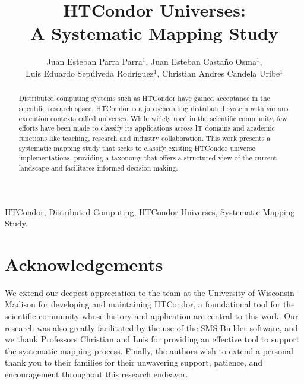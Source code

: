 \documentclass[10pt]{cys}
\title{HTCondor Universes:\\ A Systematic Mapping Study}
\author{Juan Esteban Parra Parra$^1$\orcidlink{0009-0007-4518-1086}, Juan Esteban Castaño Osma$^1$\orcidlink{0009-0006-0402-4351},\\
Luis Eduardo Sepúlveda Rodríguez$^1$\orcidlink{0000-0003-2446-0602}, Christian Andres Candela Uribe$^1$\orcidlink{0000-0002-3961-1840}}
\affil{ 
$^1$ University of Quindío, Engineering Faculty, Armenia, \authorcr   %
Colombia             
\authorcr \authorcr
juane.parrap@uqvirtual.edu.co, juane.castanoo@uqvirtual.edu.co,\\
lesepulveda@uniquindio.edu.co, cacandela@uniquindio.edu.co
\authorcr  \authorcr
}
\begin{document}
\maketitle

\renewcommand{\tablename}{Table}

\begin{abstract}
Distributed computing systems such as HTCondor have gained acceptance in the scientific research space. HTCondor is a job scheduling distributed system with various execution contexts called universes. While widely used in the scientific community, few efforts have been made to classify its applications across IT domains and academic functions like teaching, research and industry collaboration. This work presents a systematic mapping study that seeks to classify existing HTCondor universe implementations, providing a taxonomy that offers a structured view of the current landscape and facilitates informed decision-making.
\end{abstract}

\begin{keywords} 
HTCondor, Distributed Computing, HTCondor Universes, Systematic Mapping Study.
\end{keywords} 

















\section*{Acknowledgements} 
We extend our deepest appreciation to the team at the University of Wisconsin-Madison for developing and maintaining HTCondor, a foundational tool for the scientific community whose history and application are central to this work. Our research was also greatly facilitated by the use of the SMS-Builder software, and we thank Professors Christian and Luis for providing an effective tool to support the systematic mapping process.
Finally, the authors wish to extend a personal thank you to their families for their unwavering support, patience, and encouragement throughout this research endeavor.
\end{document}
